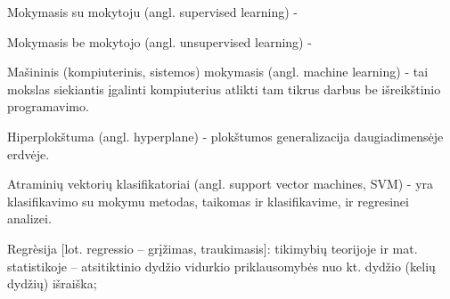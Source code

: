 Mokymasis su mokytoju (angl. supervised learning) - %

Mokymasis be mokytojo (angl. unsupervised learning) - %

Mašininis\cite{mamcenko08} (kompiuterinis, sistemos\cite{martisiute08})
mokymasis (angl. machine learning) - tai mokslas siekiantis įgalinti
kompiuterius atlikti tam tikrus darbus be išreikštinio programavimo.

Hiperplokštuma (angl. hyperplane) - plokštumos generalizacija daugiadimensėje
erdvėje.

Atraminių vektorių klasifikatoriai (angl. support vector machines, SVM) - yra
klasifikavimo su mokymu metodas, taikomas ir klasifikavime, ir regresinei
analizei.\cite{bernataviciene08}

Regrèsija [lot. regressio – grįžimas, traukimasis]: tikimybių teorijoje ir mat.
statistikoje – atsitiktinio dydžio vidurkio priklausomybės nuo kt. dydžio (kelių
dydžių) išraiška;\cite{tzz2010}
